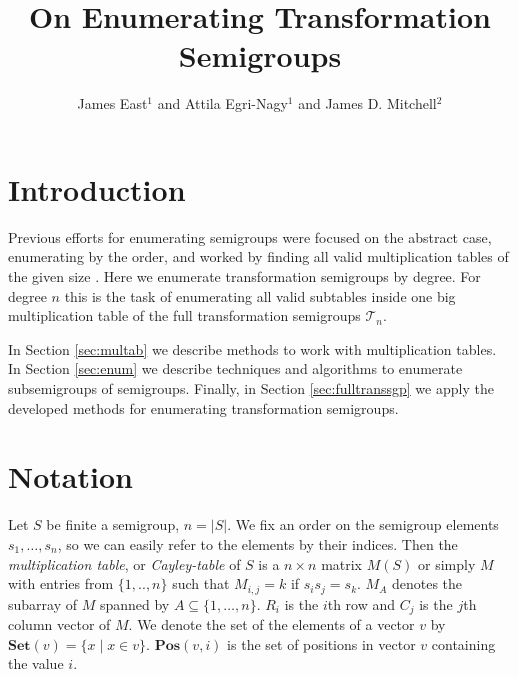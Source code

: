 \documentclass{amsart}
\newcommand{\cT}{{\mathcal T}}
\newcommand{\Set}{\mathbf{Set}}
\newcommand{\Pos}{\mathbf{Pos}}
\theoremstyle{plain}
\theoremstyle{definition}
\begin{document}
\title{On Enumerating Transformation Semigroups}
\author{James East$^1$ and Attila Egri-Nagy$^{1}$ and James D. Mitchell$^2$}
\address{$^1$Centre for Research in Mathematics, School of Computing, Engineering and Mathematics, University of Western Sydney (Parramatta Campus), Locked Bag 1797, Penrith, NSW 2751, Australia}
\address{$^2$ Mathematical Institute, University of St Andrews, North Haugh, St Andrews, Fife, KY16 9SS, Scotland}

\maketitle

\tableofcontents
\section{Introduction}
Previous efforts for enumerating semigroups were focused on the abstract case, enumerating by the order, and worked by finding all valid multiplication tables of the given size \cite{monoidenum2009}.
Here we enumerate transformation semigroups by degree.
For degree $n$ this is the task of enumerating all valid subtables inside one big multiplication table of the  full transformation semigroups $\cT_n$.

In Section \ref{sec:multab} we describe methods to work with multiplication tables.
In Section \ref{sec:enum} we describe techniques and algorithms to enumerate subsemigroups of semigroups.
Finally, in Section \ref{sec:fulltranssgp} we apply the developed methods for enumerating transformation semigroups.
\section{Notation}
Let $S$ be finite a semigroup, $n=|S|$.
We fix an order on the semigroup elements $s_1,\ldots, s_n$, so we can easily refer to the elements by their indices. 
Then the  \emph{multiplication table}, or \emph{Cayley-table} of $S$ is a $n\times n$ matrix $M(S)$ or simply $M$ with entries from $\{1,..,n\}$ such that $M_{i,j}=k$ if $s_is_j=s_k$.
$M_A$ denotes the subarray of $M$ spanned by $A\subseteq\{1,\ldots,n\}$.
$R_i$ is the $i$th row and $C_j$ is the $j$th column vector of $M$.
We denote the set of the elements of a vector $v$ by $\Set(v)=\{x\mid x\in v\}$.
$\Pos(v,i)$ is the set of positions in vector $v$ containing the value $i$.
\end{document}
